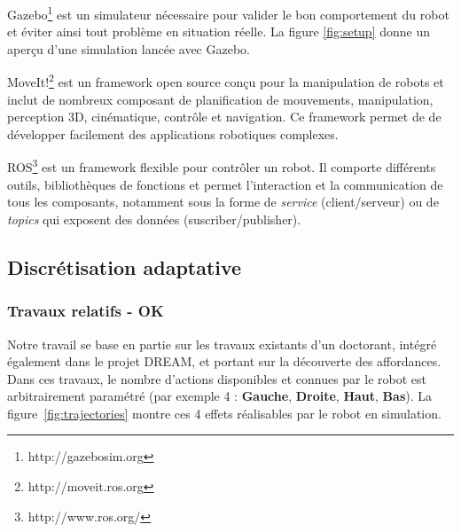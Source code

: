 \documentclass[draft]{llncs}
\begin{document}
Gazebo\footnote{http://gazebosim.org} est un simulateur nécessaire pour valider le bon comportement du robot et éviter ainsi tout problème en situation réelle.
La figure \ref{fig:setup} donne un aperçu d'une simulation lancée avec Gazebo.

MoveIt!\footnote{http://moveit.ros.org} est un framework open source conçu pour la manipulation de robots et inclut de nombreux composant de planification de mouvements, manipulation, perception 3D, cinématique, contrôle et navigation.
Ce framework permet de de développer facilement des applications robotiques complexes.

ROS\footnote{http://www.ros.org/} est un framework flexible pour contrôler un robot.
Il comporte différents outils, bibliothèques de fonctions et permet l'interaction et la communication de tous les composants, notamment sous la forme de \textit{service} (client/serveur) ou de \textit{topics} qui exposent des données (suscriber/publisher).






\subsection{Discrétisation adaptative}


\subsubsection{Travaux relatifs - OK}

Notre travail se base en partie sur les travaux existants d'un doctorant, intégré également dans le projet DREAM, et portant sur la découverte des affordances.
Dans ces travaux, le nombre d'actions disponibles et connues par le robot est arbitrairement paramétré (par exemple 4 : \textbf{Gauche}, \textbf{Droite}, \textbf{Haut}, \textbf{Bas}). La figure~\ref{fig:trajectories} montre ces 4 effets réalisables par le robot en simulation.

\end{document}
